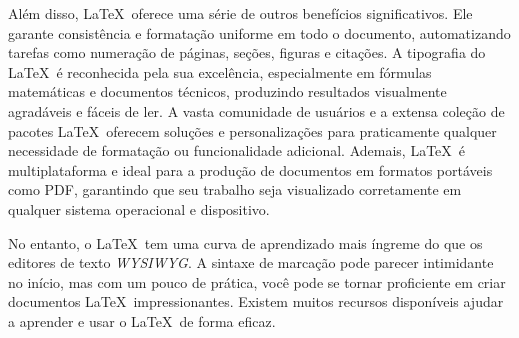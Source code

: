 Além disso, \LaTeX\ oferece uma série de outros benefícios significativos. Ele garante consistência e formatação uniforme em todo o documento, automatizando tarefas como numeração de páginas, seções, figuras e citações. A tipografia do \LaTeX\ é reconhecida pela sua excelência, especialmente em fórmulas matemáticas e documentos técnicos, produzindo resultados visualmente agradáveis e fáceis de ler. A vasta comunidade de usuários e a extensa coleção de pacotes \LaTeX\ oferecem soluções e personalizações para praticamente qualquer necessidade de formatação ou funcionalidade adicional.  Ademais, \LaTeX\ é multiplataforma e ideal para a produção de documentos em formatos portáveis como PDF, garantindo que seu trabalho seja visualizado corretamente em qualquer sistema operacional e dispositivo.

No entanto, o \LaTeX\ tem uma curva de aprendizado mais íngreme do que os editores de texto \textit{WYSIWYG}. A sintaxe de marcação pode parecer intimidante no início, mas com um pouco de prática, você pode se tornar proficiente em criar documentos \LaTeX\ impressionantes. Existem muitos recursos disponíveis ajudar a aprender e usar o \LaTeX\ de forma eficaz.

%
%
%


